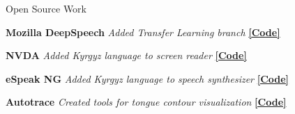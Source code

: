 \documentclass{resume} %
\begin{document}
\begin{rSection}{Open Source Work}

  {\textbf{Mozilla DeepSpeech}} {\hfill \textit{Added Transfer Learning branch} {\hspace{2.5cm} \href{https://github.com/mozilla/DeepSpeech/tree/transfer-learning}{\textbf{[Code]}}}} \\
\vspace{-.35cm}

{\textbf{NVDA}} {\hfill \textit{Added Kyrgyz language to screen reader} {\hspace{2.5cm} \href{https://github.com/JRMeyer/nvda}{\textbf{[Code]}}}} \\
\vspace{-.35cm}

{\textbf{eSpeak NG}} {\hfill \textit{Added Kyrgyz language to speech synthesizer} {\hspace{2.5cm} \href{https://github.com/rhdunn/espeak/commits?author=JRMeyer}{\textbf{[Code]}}}}\\
\vspace{-.35cm}

{\textbf{Autotrace}} {\hfill \textit{Created tools for tongue contour visualization} {\hspace{2.5cm} \href{https://github.com/JRMeyer/Autotrace}{\textbf{[Code]}}}} \\

\end{rSection}



\vspace{.25cm}
\end{document}
